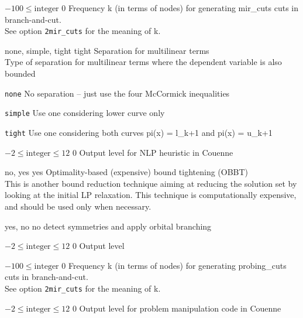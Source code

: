 %
{$-100\leq\textrm{integer}$}%
{$0$}%
{Frequency k (in terms of nodes) for generating mir\_cuts cuts in branch-and-cut.\\
See option \texttt{2mir\_cuts} for the meaning of k.}%
{}

%
{\ttfamily none, simple, tight}%
{tight}%
{Separation for multilinear terms\\
Type of separation for multilinear terms where the dependent variable is also bounded}%
{\begin{list}{}{
\setlength{\parsep}{0em}
\setlength{\leftmargin}{5ex}
\setlength{\labelwidth}{2ex}
\setlength{\itemindent}{0ex}
\setlength{\topsep}{0pt}}
\item[\texttt{none}] No separation -- just use the four McCormick inequalities
\item[\texttt{simple}] Use one considering lower curve only
\item[\texttt{tight}] Use one considering both curves pi(x) = l\_{k+1} and pi(x) = u\_{k+1}
\end{list}
}

%
{$-2\leq\textrm{integer}\leq12$}%
{$0$}%
{Output level for NLP heuristic in Couenne}%
{}

%
{\ttfamily no, yes}%
{yes}%
{Optimality-based (expensive) bound tightening (OBBT)\\
This is another bound reduction technique aiming at reducing the solution set by looking at the initial LP relaxation. This technique is computationally expensive, and should be used only when necessary.}%
{}

%
{\ttfamily yes, no}%
{no}%
{detect symmetries and apply orbital branching}%
{}

%
{$-2\leq\textrm{integer}\leq12$}%
{$0$}%
{Output level}%
{}

%
{$-100\leq\textrm{integer}$}%
{$0$}%
{Frequency k (in terms of nodes) for generating probing\_cuts cuts in branch-and-cut.\\
See option \texttt{2mir\_cuts} for the meaning of k.}%
{}

%
{$-2\leq\textrm{integer}\leq12$}%
{$0$}%
{Output level for problem manipulation code in Couenne}%
{}

